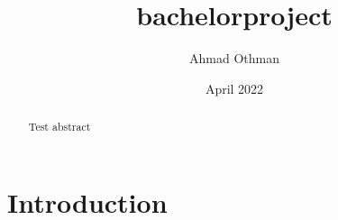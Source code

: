 \documentclass{article}
\title{bachelorproject}
\author{Ahmad Othman}
\date{April 2022}
\begin{document}
\maketitle

\begin{abstract}
Test abstract
\end{abstract}

\section{Introduction}
\cite{einstein}
\cite{burrows1994block}

\end{document}

